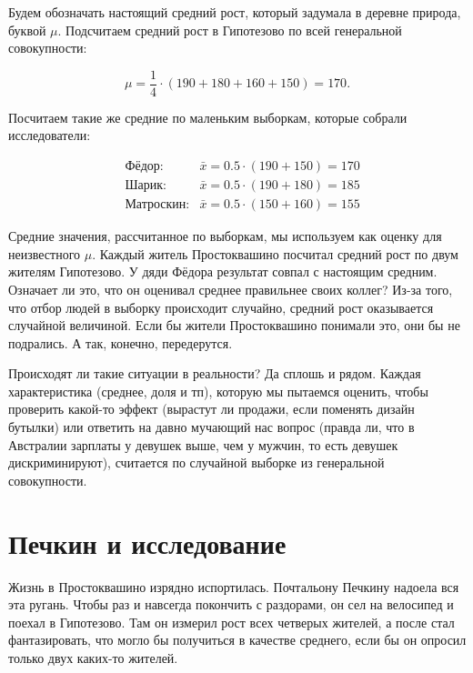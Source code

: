 \documentclass[12pt, a4paper, oneside]{article}
\begin{document}
\begin{sol}
Будем обозначать настоящий средний рост, который задумала в деревне природа, буквой $\mu$. Подсчитаем средний рост в Гипотезово  по всей генеральной совокупности: 

\[
\mu = \frac{1}{4} \cdot (190 + 180 + 160 + 150) = 170.
\]

Посчитаем такие же средние по маленьким выборкам, которые собрали исследователи: 

\begin{equation*} 
\begin{aligned} 
& \text{Фёдор:}  & \bar{x} = 0.5 \cdot (190 + 150) = 170 \\
& \text{Шарик:}  & \bar{x} = 0.5 \cdot (190 + 180) = 185 \\
& \text{Матроскин:} & \bar{x} = 0.5 \cdot (150 + 160) = 155 
\end{aligned}
\end{equation*}

Средние значения, рассчитанное по выборкам, мы используем как оценку для неизвестного $\mu$. Каждый житель Простоквашино посчитал средний рост по двум жителям Гипотезово. У дяди Фёдора результат совпал с настоящим средним. Означает ли это, что он оценивал среднее правильнее своих коллег?    Из-за того, что отбор людей в выборку происходит случайно, средний рост оказывается случайной величиной. Если бы жители Простоквашино понимали это, они бы не подрались. А так, конечно, передерутся. 

Происходят ли такие ситуации в реальности? Да сплошь и рядом. Каждая характеристика (среднее, доля и тп), которую мы пытаемся оценить, чтобы проверить какой-то эффект (вырастут ли продажи, если поменять дизайн бутылки) или ответить на давно мучающий нас вопрос (правда ли, что в Австралии зарплаты у девушек выше, чем у мужчин, то есть девушек дискриминируют), считается по случайной выборке из генеральной совокупности.  
\end{sol}

\section{Печкин и исследование}

Жизнь в Простоквашино изрядно испортилась. Почтальону Печкину надоела вся эта ругань. Чтобы раз и навсегда покончить с раздорами, он сел на велосипед и поехал в Гипотезово. Там он измерил рост всех четверых жителей, а после стал фантазировать, что могло бы получиться в качестве среднего, если бы он опросил только двух каких-то жителей. 
\end{document}
